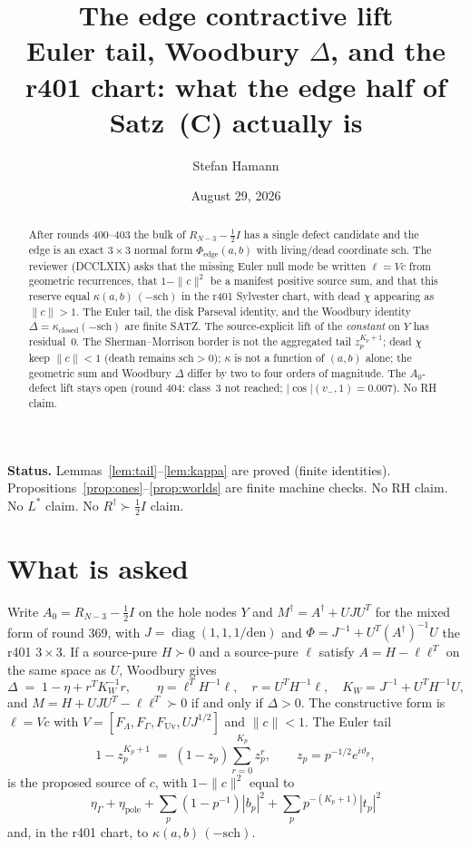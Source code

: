 \documentclass[11pt]{article}
\title{\bfseries The edge contractive lift\\[2mm]
\large Euler tail, Woodbury $\Delta$, and the r401 chart:
what the edge half of Satz~(C) actually is}
\author{Stefan Hamann}
\date{August 29, 2026}
\theoremstyle{remark}
\newcommand{\half}{\tfrac12}
\begin{document}
\maketitle

\begin{abstract}\noindent
After rounds 400--403 the bulk of $R_{N-3}-\half I$ has a
single defect candidate and the edge is an exact $3\times 3$
normal form $\Phi_{\mathrm{edge}}(a,b)$ with living/dead
coordinate $\mathrm{sch}$.
The reviewer (DCCLXIX) asks that the missing Euler null mode
be written $\ell=Vc$ from geometric recurrences, that
$1-\|c\|^2$ be a manifest positive source sum, and that this
reserve equal $\kappa(a,b)\,(-\mathrm{sch})$ in the r401
Sylvester chart, with dead $\chi$ appearing as $\|c\|>1$.
The Euler tail, the disk Parseval identity, and the Woodbury
identity $\Delta=\kappa_{\mathrm{closed}}(-\mathrm{sch})$ are
finite SATZ.
The source-explicit lift of the \emph{constant} on $Y$ has
residual~$0$.
The Sherman--Morrison border is not the aggregated tail
$z_p^{K_p+1}$; dead $\chi$ keep $\|c\|<1$ (death remains
$\mathrm{sch}>0$); $\kappa$ is not a function of $(a,b)$
alone; the geometric sum and Woodbury $\Delta$ differ by
two to four orders of magnitude.
The $A_0$-defect lift stays open (round 404: class~3 not
reached; $|\cos|(v_-,1)=0.007$).
No RH claim.
\end{abstract}

\medskip\noindent
\textbf{Status.}\enspace
Lemmas~\ref{lem:tail}--\ref{lem:kappa} are proved
(finite identities).
Propositions~\ref{prop:ones}--\ref{prop:worlds} are finite
machine checks.
No RH claim.  No $L^*$ claim.  No $R^\dagger\succ\half I$ claim.

\section{What is asked}\label{sec:ask}

Write $A_0=R_{N-3}-\half I$ on the hole nodes $Y$ and
$M^\dagger=A^\dagger+UJU^T$ for the mixed form of round 369,
with $J=\operatorname{diag}(1,1,1/\mathrm{den})$ and
$\Phi=J^{-1}+U^T(A^\dagger)^{-1}U$ the r401 $3\times 3$.
If a source-pure $H\succ 0$ and a source-pure $\ell$ satisfy
$A=H-\ell\ell^T$ on the same space as $U$, Woodbury gives
\begin{equation}\label{eq:D}
\Delta
\;=\;
1-\eta+r^T K_W^{-1}r,
\qquad
\eta=\ell^T H^{-1}\ell,
\quad
r=U^T H^{-1}\ell,
\quad
K_W=J^{-1}+U^T H^{-1}U,
\end{equation}
and $M=H+UJU^T-\ell\ell^T\succ 0$ if and only if $\Delta>0$.
The constructive form is $\ell=Vc$ with
$V=[F_\Lambda,F_\Gamma,F_{\mathrm{Uv}},UJ^{1/2}]$ and
$\|c\|<1$.
The Euler tail
\begin{equation}\label{eq:tail}
1-z_p^{K_p+1}
\;=\;
(1-z_p)\sum_{r=0}^{K_p}z_p^r,
\qquad
z_p=p^{-1/2}e^{i\vartheta_p},
\end{equation}
is the proposed source of $c$, with $1-\|c\|^2$ equal to
\begin{equation}\label{eq:sum}
\eta_\Gamma+\eta_{\mathrm{pole}}
+\sum_p(1-p^{-1})|b_p|^2
+\sum_p p^{-(K_p+1)}|t_p|^2
\end{equation}
and, in the r401 chart, to $\kappa(a,b)\,(-\mathrm{sch})$.
\end{document}
